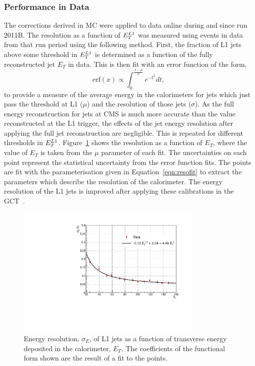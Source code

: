 \subsubsection{Performance in Data}
The corrections derived in MC were applied to data online during and since run 2011B.
The resolution as a function of $E_{T}^{L1}$ was measured using events in data from that run period
using the following method.
First, the fraction of L1 jets above some threshold in $E_{T}^{L1}$ is determined as a function 
of the fully reconstructed jet $E_{T}$ in data.  
This is then fit with an error function of the form, 
\begin{equation}
\mathrm{erf}(x)\propto \int_{0}^{\frac{x-\mu}{\sigma}} e^{-t^{2}}dt,
\end{equation}
to provide a measure of the average energy in the calorimeters 
for jets which just pass the threshold at L1 ($\mu$) and the resolution of those jets ($\sigma$). 
As the full energy reconstruction for jets at CMS is much
more accurate than the value reconstructed at the L1 trigger, the effects of the jet energy resolution
after applying the full jet reconstruction are negligible. This is repeated for different thresholds in $E_{T}^{L1}$.
Figure~\ref{fig:l1dataresolution} shows the resolution as a function
of $E_{T}$, where the value of $E_{T}$ is taken from the $\mu$ parameter of each fit. 
The uncertainties on each point represent the statistical uncertainty from the error function fits.
The points are fit with the parameterisation given in Equation~\ref{eqn:resofit} to extract the parameters which describe the
resolution of the calorimeter. The energy resolution of the L1 jets is improved after applying these 
calibrations in the GCT~\citep{l1triggernote}.

\begin{figure}
\begin{center}
\includegraphics[width=0.8\textwidth]{detector/l1jet/DataResolution.pdf}
\end{center}
\caption{Energy resolution, $\sigma_{E}$, of L1 jets as a function of transverse energy deposited in the
calorimeter, $E_{T}$. The coefficients of the functional form shown are the result of a fit to the points.}
\label{fig:l1dataresolution}
\end{figure}



